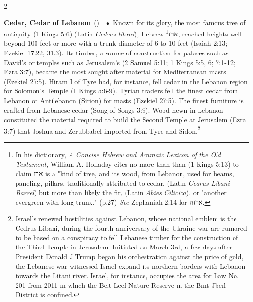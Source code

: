 \documentclass[10pt,a4paper,twoside]{article} %
\newcommand{\entry}[4]{\markboth{#1}{#1}\textbf{#1}\ {(#2)}\ \textit{#3}\ $\bullet$\ {#4}}  %
\begin{document}
\begin{multicols}{2}
\entry{Cedar, Cedar of Lebanon} {} {} {Known for its glory, the most famous tree of antiquity (1 Kings 5:6) (Latin \emph{Cedrus libani}), Hebrew \texthebrew{ארז}\footnote{In his dictionary, \emph{A Concise Hebrew and Aramaic Lexicon of the Old Testament}, William A. Holladay cites no more than than (1 Kings 5:13) to claim \texthebrew{ארז} is a "kind of tree, and its wood, from Lebanon, used for beams, paneling, pillars, traditionally attributed to cedar, (Latin \emph{Cedrus Libani Barrel}) but more than likely the fir, (Latin \emph{Abies Cilicica}), or "another evergreen with long trunk." (p.27) \emph{See} Zephaniah 2:14 for \texthebrew{ארזה}.}, reached heights well beyond 100 feet or more with a trunk diameter of 6 to 10 feet (Isaiah 2:13; Ezekiel 17:22; 31:3). Its timber, a source of construction for palaces such as David's or temples such as Jerusalem's (2 Samuel 5:11; 1 Kings 5:5, 6; 7:1-12; Ezra 3:7), became the most sought after material for Mediterranean masts (Ezekiel 27:5). Hiram I of Tyre had, for instance, fell cedar in the Lebanon region for Solomon's Temple (1 Kings 5:6-9). Tyrian traders fell the finest cedar from Lebanon or Antilebanon (Sirion) for masts (Ezekiel 27:5). The finest furniture is crafted from Lebanese cedar (Song of Songs 3:9). Wood hewn in Lebanon constituted the material required to build the Second Temple at Jerusalem (Ezra 3:7) that Joshua and Zerubbabel imported from Tyre and Sidon.\footnote{Israel's renewed hostilities against Lebanon, whose national emblem is the Cedrus Libani, during the fourth anniversary of the Ukraine war are rumored to be based on a conspiracy to fell Lebanese timber for the construction of the Third Temple in Jerusalem. Initiated on March 3rd, a few days after President Donald J Trump began his orchestration against the price of gold, the Lebanese war witnessed Israel expand its northern borders with Lebanon towards the Litani river. Israel, for instance, occupies the area for Law No. 201 from 2011 in which the Beit Leef Nature Reserve in the Bint Jbeil District is confined.  

}}
\end{multicols}
\end{document}
